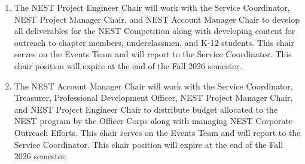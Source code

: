 \begin{enumerate}
    \item {} 
    The NEST Project Engineer Chair will work with the Service Coordinator, NEST Project Manager Chair, and NEST Account Manager Chair to develop all deliverables for the NEST Competition along with developing content for outreach to chapter members, underclassmen, and K-12 students.
This chair serves on the Events Team and will report to the Service Coordinator.
This chair position will expire at the end of the Fall 2026 semester.

    \item {}
    The NEST Account Manager Chair will work with the Service Coordinator, Treasurer, Professional Development Officer, NEST Project Manager Chair, and NEST Project Engineer Chair to distribute budget allocated to the NEST program by the Officer Corps along with managing NEST Corporate Outreach Efforts.
This chair serves on the Events Team and will report to the Service Coordinator.
This chair position will expire at the end of the Fall 2026 semester.


\end{enumerate}